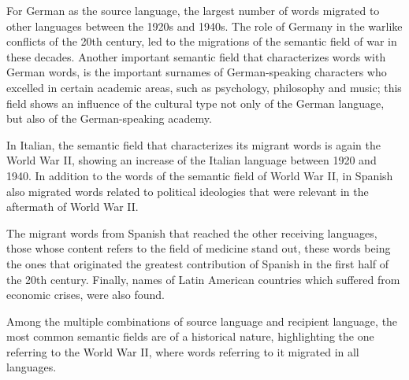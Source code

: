 \documentclass[10pt,letterpaper]{article} %
\begin{document}
	For German as the source language, the largest number of words migrated to other languages between the 1920s and 1940s. The role of Germany in the warlike conflicts of the 20th century, led to the migrations of the semantic field of war in these decades. Another important semantic field that characterizes words with German words, is the important surnames of German-speaking characters who excelled in certain academic areas, such as psychology, philosophy and music; this field shows an influence of the cultural type not only of the German language, but also of the German-speaking academy.
	
	In Italian, the semantic field that characterizes its migrant words  is again the World War II, showing an increase of the Italian language between 1920 and 1940. In addition to the words of the semantic field of World War II, in Spanish also migrated words related to political ideologies that were relevant in the aftermath of World War II.
	
	
	The migrant words from Spanish that reached the other receiving languages, those whose content refers to the field of medicine stand out, these words being the ones that originated the greatest contribution of Spanish in the first half of the 20th century. Finally, names of Latin American countries  which suffered from economic crises, were also found.
	
	Among the multiple combinations of source language and recipient language, the most common semantic fields are of a historical nature, highlighting the one referring to the World War II, where words referring to it migrated in all languages.
	
	
	
\end{document}
